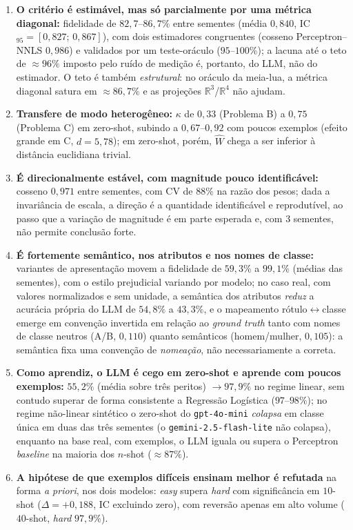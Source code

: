 \documentclass[12pt,a4paper]{article}
\newcommand{\West}{\ensuremath{\hat{W}}}   %
\begin{document}
\begin{enumerate}
  \item \textbf{O critério é estimável, mas só parcialmente por uma métrica diagonal:}
    fidelidade de $82{,}7$–$86{,}7\%$ entre sementes (média $0{,}840$,
    IC$_{95}=[0{,}827;\,0{,}867]$), com
    dois estimadores congruentes (cosseno Perceptron--NNLS $0{,}986$) e validados por um
    teste-oráculo ($95$–$100\%$); a lacuna até o teto de $\approx 96\%$ imposto pelo ruído
    de medição é, portanto, do LLM, não do estimador. O teto é também \emph{estrutural}: no
    oráculo da meia-lua, a métrica diagonal satura em $\approx 86{,}7\%$ e as projeções
    $\mathbb{R}^3$/$\mathbb{R}^4$ não ajudam.
  \item \textbf{Transfere de modo heterogêneo:} $\kappa$ de $0{,}33$ (Problema B) a $0{,}75$
    (Problema C) em zero-shot, subindo a $0{,}67$–$0{,}92$ com poucos exemplos (efeito
    grande em C, $d=5{,}78$); em zero-shot, porém, \West{} chega a ser inferior à distância
    euclidiana trivial.
  \item \textbf{É direcionalmente estável, com magnitude pouco identificável:} cosseno
    $0{,}971$ entre sementes, com CV de $88\%$ na razão dos pesos; dada a invariância de
    escala, a direção é a quantidade identificável e reprodutível, ao passo que a variação de
    magnitude é em parte esperada e, com $3$ sementes, não permite conclusão forte.
  \item \textbf{É fortemente semântico, nos atributos e nos nomes de classe:}
    variantes de apresentação movem a fidelidade de $59{,}3\%$ a $99{,}1\%$ (médias das
    sementes), com o estilo prejudicial variando por modelo; no caso real, com valores
    normalizados e sem unidade, a semântica dos atributos \emph{reduz} a acurácia própria
    do LLM de $54{,}8\%$ a $43{,}3\%$, e o mapeamento rótulo$\leftrightarrow$classe emerge
    em convenção invertida em relação ao \emph{ground truth} tanto com nomes de classe
    neutros (A/B, $0{,}110$) quanto semânticos (homem/mulher, $0{,}105$): a semântica fixa
    uma convenção de \emph{nomeação}, não necessariamente a correta.
  \item \textbf{Como aprendiz, o LLM é cego em zero-shot e aprende com poucos exemplos:}
    $55{,}2\%$ (média sobre três peritos) $\to 97{,}9\%$ no regime linear, sem contudo
    superar de forma consistente a Regressão Logística
    ($97$–$98\%$); no regime não-linear sintético o zero-shot do \texttt{gpt-4o-mini}
    \emph{colapsa} em classe única em duas das três sementes (o
    \texttt{gemini-2.5-flash-lite} não colapsa), enquanto na base real, com exemplos, o LLM
    iguala ou supera o Perceptron \emph{baseline} na maioria dos $n$-shot ($\approx 87\%$).
  \item \textbf{A hipótese de que exemplos difíceis ensinam melhor é refutada} na forma
    \emph{a priori}, nos dois modelos: \emph{easy} supera \emph{hard} com significância em
    $10$-shot ($\Delta = +0{,}188$, IC excluindo zero), com reversão apenas em alto volume
    ($40$-shot, \emph{hard} $97{,}9\%$).
\end{enumerate}
\end{document}
